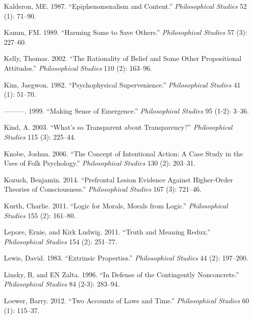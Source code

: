 \documentclass[
  10pt,
  letterpaper,
  DIV=11,
  numbers=noendperiod,
  twoside]{scrartcl}
\newlength{\cslhangindent}
\newenvironment{CSLReferences}[2] %
 {\begin{list}{}{%
  \setlength{\itemindent}{0pt}
  \setlength{\leftmargin}{0pt}
  \setlength{\parsep}{0pt}
  \ifodd #1
   \setlength{\leftmargin}{\cslhangindent}
   \setlength{\itemindent}{-1\cslhangindent}
  \fi
  \setlength{\itemsep}{#2\baselineskip}}}
 {\end{list}}
\begin{document}
\begin{CSLReferences}{1}{0}
Kalderon, ME. 1987. {``Epiphenomenalism and Content.''}
\emph{Philosophical Studies} 52 (1): 71--90.

Kamm, FM. 1989. {``Harming Some to Save Others.''} \emph{Philosophical
Studies} 57 (3): 227--60.

Kelly, Thomas. 2002. {``The Rationality of Belief and Some Other
Propositional Attitudes.''} \emph{Philosophical Studies} 110 (2):
163--96.

Kim, Jaegwon. 1982. {``Psychophysical Supervenience.''}
\emph{Philosophical Studies} 41 (1): 51--70.

---------. 1999. {``Making Sense of Emergence.''} \emph{Philosophical
Studies} 95 (1-2): 3--36.

Kind, A. 2003. {``What's so Transparent about Transparency?''}
\emph{Philosophical Studies} 115 (3): 225--44.

Knobe, Joshua. 2006. {``The Concept of Intentional Action: A Case Study
in the Uses of Folk Psychology.''} \emph{Philosophical Studies} 130 (2):
203--31.

Kozuch, Benjamin. 2014. {``Prefrontal Lesion Evidence Against
Higher-Order Theories of Consciousness.''} \emph{Philosophical Studies}
167 (3): 721--46.

Kurth, Charlie. 2011. {``Logic for Morals, Morals from Logic.''}
\emph{Philosophical Studies} 155 (2): 161--80.

Lepore, Ernie, and Kirk Ludwig. 2011. {``Truth and Meaning Redux.''}
\emph{Philosophical Studies} 154 (2): 251--77.

Lewis, David. 1983. {``Extrinsic Properties.''} \emph{Philosophical
Studies} 44 (2): 197--200.

Linsky, B, and EN Zalta. 1996. {``In Defense of the Contingently
Nonconcrete.''} \emph{Philosophical Studies} 84 (2-3): 283--94.

Loewer, Barry. 2012. {``Two Accounts of Laws and Time.''}
\emph{Philosophical Studies} 60 (1): 115--37.


\end{CSLReferences}
\end{document}
